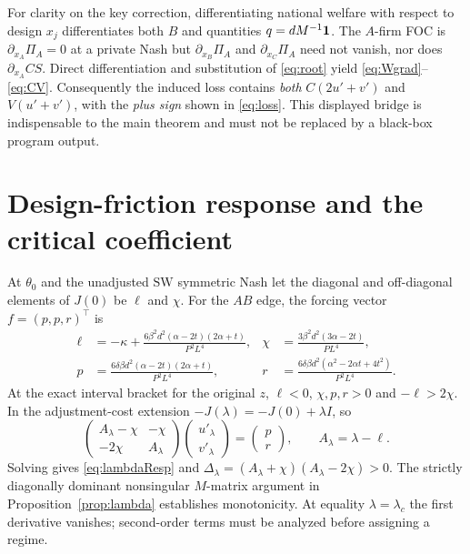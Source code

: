 \documentclass[11pt,a4paper]{article}
\theoremstyle{remark}\newtheorem{remark}[theorem]{Remark}
\newcommand{\SW}{\mathrm{SW}}\newcommand{\SU}{\mathrm{SU}}\newcommand{\IS}{\mathrm{IS}}
\begin{document}
For clarity on the key correction, differentiating national welfare with respect to design $x_j$ differentiates both $B$ and quantities $q=dM^{-1}\boldsymbol{1}$. The $A$-firm FOC is $\partial_{x_A}\Pi_A=0$ at a private Nash but $\partial_{x_B}\Pi_A$ and $\partial_{x_C}\Pi_A$ need not vanish, nor does $\partial_{x_A}CS$. Direct differentiation and substitution of \eqref{eq:root} yield \eqref{eq:Wgrad}--\eqref{eq:CV}. Consequently the induced loss contains \emph{both} $C(2u'+v')$ and $V(u'+v')$, with the \emph{plus sign} shown in \eqref{eq:loss}. This displayed bridge is indispensable to the main theorem and must not be replaced by a black-box program output.

\section{Design-friction response and the critical coefficient}\label{app:lambda}
At $\theta_0$ and the unadjusted $\SW$ symmetric Nash let the diagonal and off-diagonal elements of $J(0)$ be $\ell$ and $\chi$. For the $AB$ edge, the forcing vector $f=(p,p,r)^{\top}$ is
\begin{align}
\ell&=-\kappa+\frac{6\beta^2d^2(\alpha-2t)(2\alpha+t)}{P^2L^4},
&\chi&=\frac{3\beta^2d^2(3\alpha-2t)}{PL^4},\\
p&=\frac{6\delta\beta d^2(\alpha-2t)(2\alpha+t)}{P^2L^4},
&r&=\frac{6\delta\beta d^2(\alpha^2-2\alpha t+4t^2)}{P^2L^4}.
\end{align}
At the exact interval bracket for the original $z$, $\ell<0$, $\chi,p,r>0$ and $-\ell>2\chi$. In the adjustment-cost extension $-J(\lambda)=-J(0)+\lambda I$, so
\[
\begin{pmatrix} A_\lambda-\chi &-\chi\\ -2\chi&A_\lambda\end{pmatrix}
\begin{pmatrix}u'_\lambda\\v'_\lambda\end{pmatrix}=
\begin{pmatrix}p\\r\end{pmatrix},\qquad A_\lambda=\lambda-\ell.
\]
Solving gives \eqref{eq:lambdaResp} and $\Delta_\lambda=(A_\lambda+\chi)(A_\lambda-2\chi)>0$. The strictly diagonally dominant nonsingular $M$-matrix argument in Proposition~\ref{prop:lambda} establishes monotonicity. At equality $\lambda=\lambda_c$ the first derivative vanishes; second-order terms must be analyzed before assigning a regime.
\end{document}
